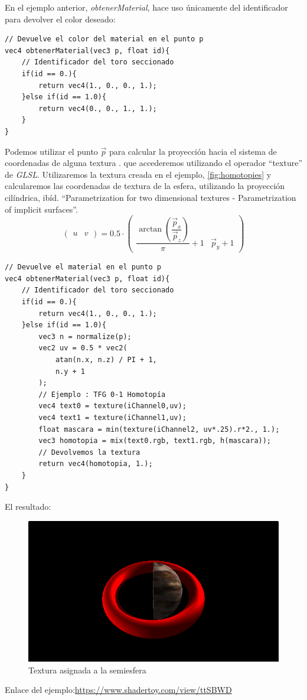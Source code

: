 En el ejemplo anterior, \textit{obtenerMaterial}, hace uso únicamente del identificador para devolver el color deseado:

\begin{lstlisting}
// Devuelve el color del material en el punto p
vec4 obtenerMaterial(vec3 p, float id){
    // Identificador del toro seccionado
    if(id == 0.){
        return vec4(1., 0., 0., 1.);
    }else if(id == 1.0){
        return vec4(0., 0., 1., 1.);
    }
}
\end{lstlisting}

Podemos utilizar el punto \(\Vec{p}\) para calcular la proyección hacia el sistema de coordenadas de alguna textura \cite{projections}. que accederemos utilizando el operador \enquote{texture} de \textit{GLSL}. Utilizaremos la textura creada en el ejemplo, \ref{fig:homotopies} y calcularemos las coordenadas de textura de la esfera, utilizando la proyección cilíndrica, ibíd. \enquote{Parametrization for two dimensional textures - Parametrization of implicit surfaces}.
\[\begin{pmatrix}
    u&
    v
\end{pmatrix}=  0.5\cdot
\begin{pmatrix}
    \dfrac{\arctan\left(\dfrac{\Vec{p}_x}{\Vec{p}_z}\right)}{\pi}+1&
    \Vec{p}_y + 1
\end{pmatrix}
\]

\begin{lstlisting}
// Devuelve el material en el punto p
vec4 obtenerMaterial(vec3 p, float id){
    // Identificador del toro seccionado
    if(id == 0.){
        return vec4(1., 0., 0., 1.);
    }else if(id == 1.0){
    	vec3 n = normalize(p);
        vec2 uv = 0.5 * vec2(
            atan(n.x, n.z) / PI + 1,
            n.y + 1
        );
        // Ejemplo : TFG 0-1 Homotopía
        vec4 text0 = texture(iChannel0,uv);
        vec4 text1 = texture(iChannel1,uv);
        float mascara = min(texture(iChannel2, uv*.25).r*2., 1.);
        vec3 homotopia = mix(text0.rgb, text1.rgb, h(mascara));
        // Devolvemos la textura
        return vec4(homotopia, 1.);
    }
}
\end{lstlisting}

El resultado:

\begin{figure}[H]
  \centering
  \captionsetup{justification=centering}%
  \includegraphics[width=1.0\textwidth]{secciones/imagenes/material/textura.png}
  \caption{Textura asignada a la semiesfera}
  \label{fig:texture}
\end{figure}

Enlace del ejemplo:\url{https://www.shadertoy.com/view/ttSBWD}